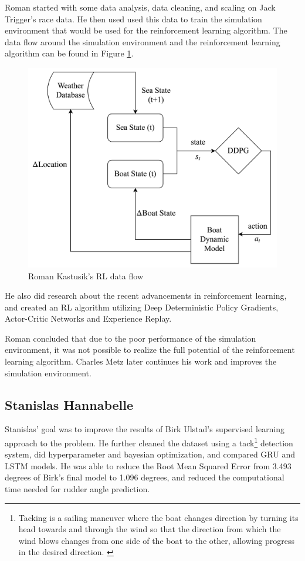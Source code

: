 \documentclass[12pt,twoside]{report}
\begin{document}
Roman started with some data analysis, data cleaning, and scaling on Jack Trigger's race data. He then used  used this data to train the simulation environment that would be used for the reinforcement learning algorithm. The data flow around the simulation environment and the reinforcement learning algorithm can be found in Figure \ref{fig:roman dataflow}.

\begin{figure}[h]
\centering
\includegraphics[width = 0.65\hsize]{figures/roman data flow.png}
\caption{Roman Kastusik's RL data flow}
\label{fig:roman dataflow}
\end{figure}

He also did research about the recent advancements in reinforcement learning, and created an RL algorithm utilizing Deep Deterministic Policy Gradients, Actor-Critic Networks and Experience Replay.

Roman concluded that due to the poor performance of the simulation environment, it was not possible to realize the full potential of the reinforcement learning algorithm. Charles Metz later continues his work and improves the simulation environment.

\subsection{Stanislas Hannabelle}
Stanislas' goal was to improve the results of Birk Ulstad's supervised learning approach to the problem. He further cleaned the dataset using a tack\footnote{Tacking is a sailing maneuver where the boat changes direction by turning its head towards and through the wind so that the direction from which the wind blows changes from one side of the boat to the other, allowing progress in the desired direction. \cite{wiki:tack}} detection system, did hyperparameter and bayesian optimization, and compared GRU and LSTM models. He was able to reduce the Root Mean Squared Error from 3.493 degrees of Birk's final model to 1.096 degrees, and reduced the computational time needed for rudder angle prediction. \cite{stan}
\end{document}
